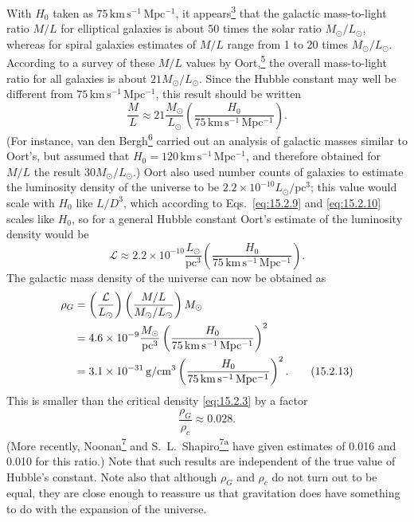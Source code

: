 With \(H_0\) taken as \(75\,\mathrm{km\,s^{-1}\,Mpc^{-1}}\), it
appears\hyperref[ch15-ref-3]{\textsuperscript{3}} that the galactic
mass-to-light ratio \(M/L\) for elliptical galaxies is about 50 times the
solar ratio \(M_\odot/L_\odot\), whereas for spiral galaxies estimates of
\(M/L\) range from 1 to 20 times \(M_\odot/L_\odot\). According to a
survey of these \(M/L\) values by
Oort,\hyperref[ch15-ref-5]{\textsuperscript{5}} the overall mass-to-light
ratio for all galaxies is about \(21M_\odot/L_\odot\). Since the Hubble
constant may well be different from \(75\,\mathrm{km\,s^{-1}\,Mpc^{-1}}\),
this result should be written
\begin{equation}
  \frac{M}{L}
  \approx
  21\frac{M_\odot}{L_\odot}
  \left(
    \frac{H_0}{75\,\mathrm{km\,s^{-1}\,Mpc^{-1}}}
  \right).
  \tag{15.2.11}\label{eq:15.2.11}
\end{equation}
(For instance, van den
Bergh\hyperref[ch15-ref-6]{\textsuperscript{6}} carried out an analysis of
galactic masses similar to Oort's, but assumed that
\(H_0=120\,\mathrm{km\,s^{-1}\,Mpc^{-1}}\), and therefore obtained for
\(M/L\) the result \(30M_\odot/L_\odot\).) Oort also used number counts
of galaxies to estimate the luminosity density of the universe to be
\(2.2\times10^{-10}L_\odot/\mathrm{pc^3}\); this value would scale with
\(H_0\) like \(L/D^3\), which according to Eqs.~\eqref{eq:15.2.9} and
\eqref{eq:15.2.10} scales like \(H_0\), so for a general Hubble constant
Oort's estimate of the luminosity density would be
\begin{equation}
  \mathcal L
  \approx
  2.2\times10^{-10}\frac{L_\odot}{\mathrm{pc^3}}
  \left(
    \frac{H_0}{75\,\mathrm{km\,s^{-1}\,Mpc^{-1}}}
  \right).
  \tag{15.2.12}\label{eq:15.2.12}
\end{equation}
The galactic mass density of the universe can now be obtained as
\begin{align}
  \rho_G
  &=
  \left(\frac{\mathcal L}{L_\odot}\right)
  \left(\frac{M/L}{M_\odot/L_\odot}\right)M_\odot
  \notag\\
  &=
  4.6\times10^{-9}\frac{M_\odot}{\mathrm{pc^3}}
  \left(
    \frac{H_0}{75\,\mathrm{km\,s^{-1}\,Mpc^{-1}}}
  \right)^2
  \notag\\
  &=
  3.1\times10^{-31}\,\mathrm{g/cm^3}
  \left(
    \frac{H_0}{75\,\mathrm{km\,s^{-1}\,Mpc^{-1}}}
  \right)^2.
  \tag{15.2.13}\label{eq:15.2.13}
\end{align}
This is smaller than the critical density \eqref{eq:15.2.3} by a factor
\begin{equation}
  \frac{\rho_G}{\rho_c}\approx0.028.
  \tag{15.2.14}\label{eq:15.2.14}
\end{equation}
(More recently, Noonan\hyperref[ch15-ref-7]{\textsuperscript{7}} and
S.~L.~Shapiro\hyperref[ch15-ref-7a]{\textsuperscript{7a}} have given
estimates of 0.016 and 0.010 for this ratio.) Note that such results are
independent of the true value of Hubble's constant. Note also that although
\(\rho_G\) and \(\rho_c\) do not turn out to be equal, they are close
enough to reassure us that gravitation does have something to do with the
expansion of the universe.


